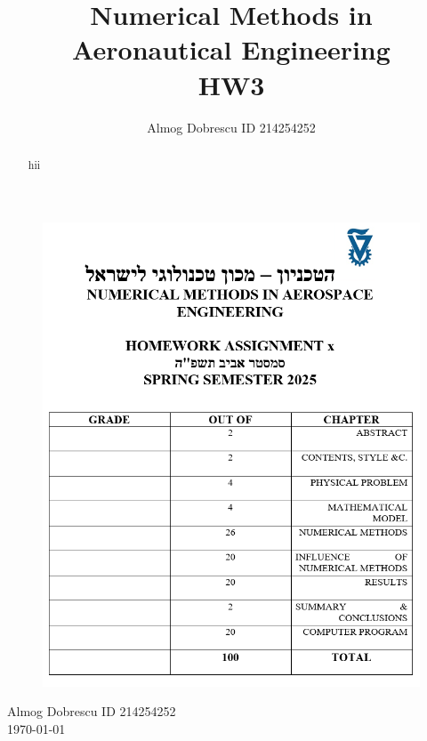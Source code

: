 \documentclass[11pt, a4paper]{article}
\title{Numerical Methods in Aeronautical Engineering \\ HW3}
\author{Almog Dobrescu ID 214254252}
\begin{document}
\thispagestyle{empty}
\begin{figure}[H]
    \centering
    \includegraphics[width=\textwidth]{./../../Cover page for computational assignments 2025.png}
    \label{fig: cover page}
\end{figure}
\begin{center}
    \Huge
    Almog Dobrescu \qquad ID 214254252 \\ \vspace{0.5cm}
    \today
\end{center}
\newpage

\begin{abstract}
    hii
\end{abstract}

\tableofcontents
\vfil
\listoffigures
\vfil
\lstlistoflistings
\newpage

\printnomenclature
\newpage
\end{document}
